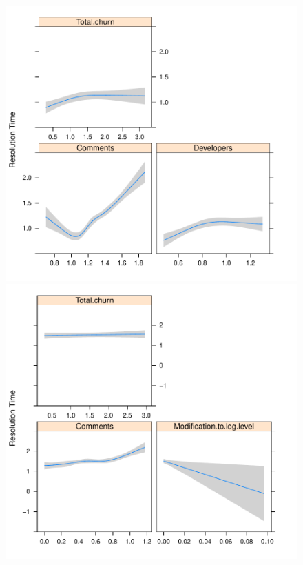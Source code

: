 \begin{figure}[t]
	\begin{minipage}{.5\columnwidth}
		\centering
		
		\includegraphics[width=.95\textwidth]{HadoopDirectionPlot}	
	\end{minipage}
		\begin{minipage}{.5\columnwidth}
			\centering
			
			\includegraphics[width=.95\textwidth]{QpidDirectionPlot}	
		\end{minipage}
			

\end{figure}
